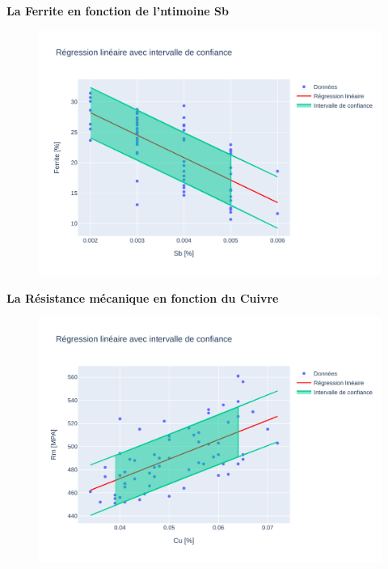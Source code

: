 \documentclass[12pt]{article}
\begin{document}
\textbf{La Ferrite en fonction de l'ntimoine Sb} 
\begin{figure}[H]
\includegraphics[width=\textwidth]{Images/Statistique/Regression_Ferrite_Sb.pdf} 
\end{figure}





\textbf{La Résistance mécanique en fonction du Cuivre} 
\begin{figure}[H]
\includegraphics[width=\textwidth]{Images/Statistique/Regression_Cu_Rm.pdf} 
\end{figure}
\end{document}
